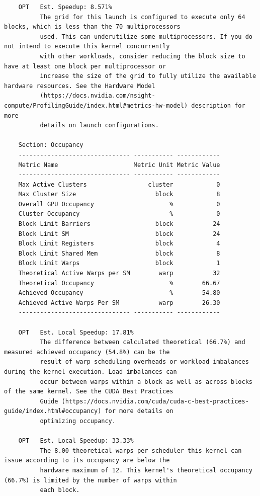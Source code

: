 \begin{lstlisting}
    OPT   Est. Speedup: 8.571%
          The grid for this launch is configured to execute only 64 blocks, which is less than the 70 multiprocessors
          used. This can underutilize some multiprocessors. If you do not intend to execute this kernel concurrently
          with other workloads, consider reducing the block size to have at least one block per multiprocessor or
          increase the size of the grid to fully utilize the available hardware resources. See the Hardware Model
          (https://docs.nvidia.com/nsight-compute/ProfilingGuide/index.html#metrics-hw-model) description for more
          details on launch configurations.

    Section: Occupancy
    ------------------------------- ----------- ------------
    Metric Name                     Metric Unit Metric Value
    ------------------------------- ----------- ------------
    Max Active Clusters                 cluster            0
    Max Cluster Size                      block            8
    Overall GPU Occupancy                     %            0
    Cluster Occupancy                         %            0
    Block Limit Barriers                  block           24
    Block Limit SM                        block           24
    Block Limit Registers                 block            4
    Block Limit Shared Mem                block            8
    Block Limit Warps                     block            1
    Theoretical Active Warps per SM        warp           32
    Theoretical Occupancy                     %        66.67
    Achieved Occupancy                        %        54.80
    Achieved Active Warps Per SM           warp        26.30
    ------------------------------- ----------- ------------

    OPT   Est. Local Speedup: 17.81%
          The difference between calculated theoretical (66.7%) and measured achieved occupancy (54.8%) can be the
          result of warp scheduling overheads or workload imbalances during the kernel execution. Load imbalances can
          occur between warps within a block as well as across blocks of the same kernel. See the CUDA Best Practices
          Guide (https://docs.nvidia.com/cuda/cuda-c-best-practices-guide/index.html#occupancy) for more details on
          optimizing occupancy.
   
    OPT   Est. Local Speedup: 33.33%
          The 8.00 theoretical warps per scheduler this kernel can issue according to its occupancy are below the
          hardware maximum of 12. This kernel's theoretical occupancy (66.7%) is limited by the number of warps within
          each block.


\end{lstlisting}
